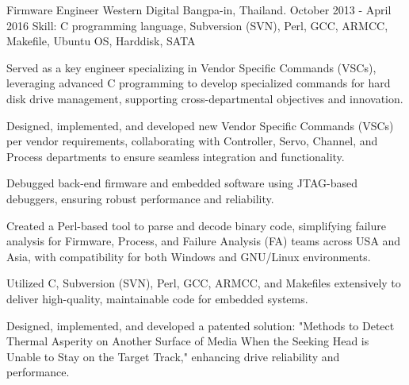 \begin{cventries}
  \cventry
    {Firmware Engineer} %
    {Western Digital} %
    {Bangpa-in, Thailand.} %
    {October 2013 - April 2016} %
    {Skill: C programming language, Subversion (SVN), Perl, GCC, ARMCC,
    Makefile, Ubuntu OS, Harddisk, SATA} %
    {
      \begin{cvitems} %
        \item {Served as a key engineer specializing in Vendor Specific Commands (VSCs), leveraging advanced C programming to develop specialized commands for hard disk drive management, supporting cross-departmental objectives and innovation.}
        \item {Designed, implemented, and developed new Vendor Specific Commands (VSCs) per vendor requirements, collaborating with Controller, Servo, Channel, and Process departments to ensure seamless integration and functionality.}
        \item {Debugged back-end firmware and embedded software using JTAG-based debuggers, ensuring robust performance and reliability.}
        \item {Created a Perl-based tool to parse and decode binary code, simplifying failure analysis for Firmware, Process, and Failure Analysis (FA) teams across USA and Asia, with compatibility for both Windows and GNU/Linux environments.}
        \item {Utilized C, Subversion (SVN), Perl, GCC, ARMCC, and Makefiles extensively to deliver high-quality, maintainable code for embedded systems.}
        \item {Designed, implemented, and developed a patented solution: "Methods to Detect Thermal Asperity on Another Surface of Media When the Seeking Head is Unable to Stay on the Target Track," enhancing drive reliability and performance.}
      \end{cvitems}
    }

\end{cventries}
